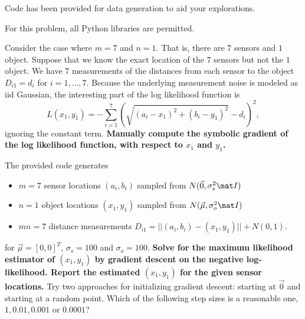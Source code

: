 \documentclass[preview]{standalone}
\begin{document}
Code has been provided for data generation to aid your explorations.

For this problem, all Python libraries are permitted.

\begin{Parts}
\Part Consider the case where $m=7$ and $n=1$. That is, there are $7$
sensors and $1$ object. Suppose that we know the exact location of the
$7$ sensors but not the $1$ object. We have $7$ measurements of the
distances from each sensor to the object $D_{i1}=d_i$ for
$i=1,\dots,7$. Because the underlying measurement noise is modeled as
iid Gaussian, the interesting part of the log likelihood function is
\begin{equation}
L(x_1,y_1) = -\sum_{i=1}^7(\sqrt{(a_i-x_1)^2+(b_i-y_1)^2}-d_i)^2,
\end{equation}
ignoring the constant term. \textbf{Manually compute the symbolic gradient of the log likelihood function, with respect to $x_1$ and $y_1$.}


\Part The provided code generates
  \begin{itemize}
    \item $m=7$ sensor locations $(a_i, b_i)$ sampled from $N(\vec 0, \sigma_s^2 \mat I)$
    \item $n=1$ object locations $(x_1, y_1)$ sampled from $N(\vec \mu, \sigma_o^2 \mat I)$
    \item $mn=7$ distance measurements $D_{i1} = ||(a_i,b_i)-(x_1,y_1)|| + N(0, 1)$.
  \end{itemize}
  for $\vec \mu=[0, 0]^T$, $\sigma_s= 100$ and
  $\sigma_o=100$. \textbf{Solve for the maximum likelihood estimator
    of $(x_1,y_1)$ by gradient descent on the negative log-likelihood. Report the estimated
    $(x_1,y_1)$ for the given sensor locations.} Try two approaches
  for initializing gradient descent: starting at $\vec{0}$ and
  starting at a random point. Which of the following step sizes is a reasonable one, $1, 0.01, 0.001$ or $0.0001$?








\end{Parts}
\end{document}

